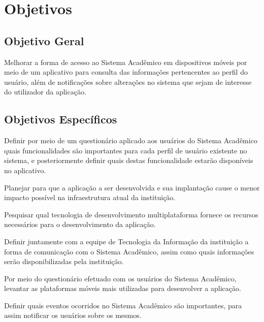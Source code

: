 \section{Objetivos}
\subsection{Objetivo Geral}
Melhorar a forma de acesso ao Sistema Acadêmico em dispositivos móveis por meio de um aplicativo para consulta das informações pertencentes ao perfil do usuário, além de notificações sobre alterações no sistema que sejam de interesse do utilizador da aplicação.

\subsection{Objetivos Específicos}
Definir por meio de um questionário aplicado aos usuários do Sistema Acadêmico quais funcionalidades são importantes para cada perfil de usuário existente no sistema, e posteriormente definir quais destas funcionalidade estarão disponíveis no aplicativo.

Planejar para que a aplicação a ser desenvolvida e sua implantação cause o menor impacto possível na infraestrutura atual da instituição.

Pesquisar qual tecnologia de desenvolvimento multiplataforma fornece os recursos necessários para o desenvolvimento da aplicação.

Definir juntamente com a equipe de Tecnologia da Informação da instituição a forma de comunicação com o Sistema Acadêmico, assim como quais informações serão disponibilizadas pela instituição. 

Por meio do questionário efetuado com os usuários do Sistema Acadêmico, levantar as plataformas móveis mais utilizadas para desenvolver a aplicação.

Definir quais eventos ocorridos no Sistema Acadêmico são importantes, para assim notificar os usuários sobre os mesmos. 